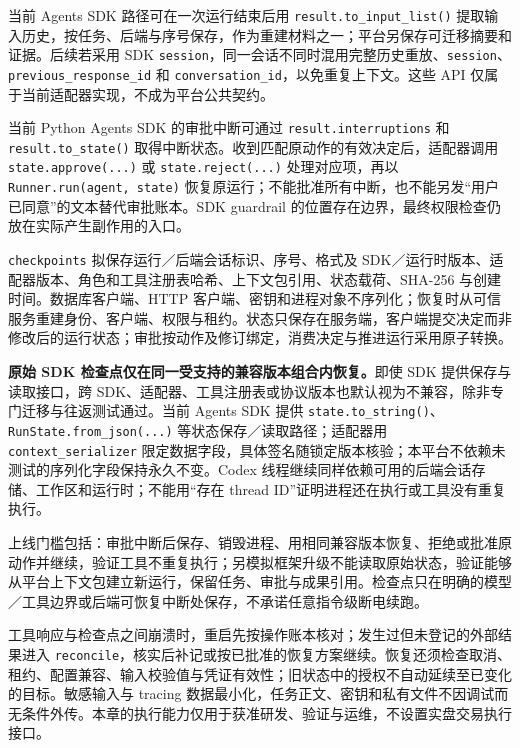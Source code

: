 \documentclass[11pt,a4paper]{article}
\begin{document}
当前 Agents SDK 路径可在一次运行结束后用 \texttt{result.\allowbreak to\_input\_list()} 提取输入历史，按任务、后端与序号保存，作为重建材料之一；平台另保存可迁移摘要和证据。后续若采用 SDK \texttt{session}，同一会话不同时混用完整历史重放、\texttt{session}、\texttt{previous\_response\_id} 和 \texttt{conversation\_id}，以免重复上下文。这些 API 仅属于当前适配器实现，不成为平台公共契约。\cite{rdRuntimeResults,rdRuntimeRun}

当前 Python Agents SDK 的审批中断可通过 \texttt{result.\allowbreak interruptions} 和 \texttt{result.\allowbreak to\_state()} 取得中断状态。收到匹配原动作的有效决定后，适配器调用 \texttt{state.approve(...)} 或 \texttt{state.reject(...)} 处理对应项，再以 \texttt{Runner.run(agent, state)} 恢复原运行；不能批准所有中断，也不能另发“用户已同意”的文本替代审批账本。SDK guardrail 的位置存在边界，最终权限检查仍放在实际产生副作用的入口。\cite{rdRuntimeApproval}

\texttt{checkpoints} 拟保存运行／后端会话标识、序号、格式及 SDK／运行时版本、适配器版本、角色和工具注册表哈希、上下文包引用、状态载荷、SHA-256 与创建时间。数据库客户端、HTTP 客户端、密钥和进程对象不序列化；恢复时从可信服务重建身份、客户端、权限与租约。状态只保存在服务端，客户端提交决定而非修改后的运行状态；审批按动作及修订绑定，消费决定与推进运行采用原子转换。

\textbf{原始 SDK 检查点仅在同一受支持的兼容版本组合内恢复。}即使 SDK 提供保存与读取接口，跨 SDK、适配器、工具注册表或协议版本也默认视为不兼容，除非专门迁移与往返测试通过。当前 Agents SDK 提供 \texttt{state.to\_string()}、\texttt{RunState.from\_json(...)} 等状态保存／读取路径；适配器用 \texttt{context\_serializer} 限定数据字段，具体签名随锁定版本核验；本平台不依赖未测试的序列化字段保持永久不变。\cite{rdRuntimePersistent}Codex 线程继续同样依赖可用的后端会话存储、工作区和运行时；不能用“存在 thread ID”证明进程还在执行或工具没有重复执行。\cite{codex-sdk,v121-codex-exec}

上线门槛包括：审批中断后保存、销毁进程、用相同兼容版本恢复、拒绝或批准原动作并继续，验证工具不重复执行；另模拟框架升级不能读取原始状态，验证能够从平台上下文包建立新运行，保留任务、审批与成果引用。检查点只在明确的模型／工具边界或后端可恢复中断处保存，不承诺任意指令级断电续跑。

工具响应与检查点之间崩溃时，重启先按操作账本核对；发生过但未登记的外部结果进入 \texttt{reconcile}，核实后补记或按已批准的恢复方案继续。恢复还须检查取消、租约、配置兼容、输入校验值与凭证有效性；旧状态中的授权不自动延续至已变化的目标。敏感输入与 tracing 数据最小化，任务正文、密钥和私有文件不因调试而无条件外传。本章的执行能力仅用于获准研发、验证与运维，不设置实盘交易执行接口。
\end{document}
